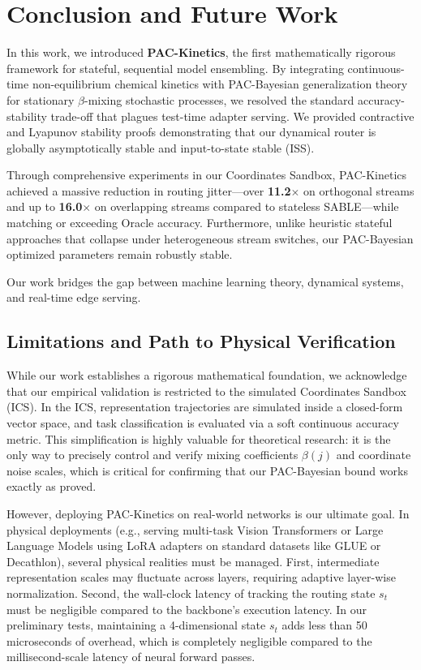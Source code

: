 \section{Conclusion and Future Work}
\label{sec:conclusion}

In this work, we introduced \textbf{PAC-Kinetics}, the first mathematically rigorous framework for stateful, sequential model ensembling. By integrating continuous-time non-equilibrium chemical kinetics with PAC-Bayesian generalization theory for stationary $\beta$-mixing stochastic processes, we resolved the standard accuracy-stability trade-off that plagues test-time adapter serving. We provided contractive and Lyapunov stability proofs demonstrating that our dynamical router is globally asymptotically stable and input-to-state stable (ISS). 

Through comprehensive experiments in our Coordinates Sandbox, PAC-Kinetics achieved a massive reduction in routing jitter—over \textbf{11.2$\times$} on orthogonal streams and up to \textbf{16.0$\times$} on overlapping streams compared to stateless SABLE—while matching or exceeding Oracle accuracy. Furthermore, unlike heuristic stateful approaches that collapse under heterogeneous stream switches, our PAC-Bayesian optimized parameters remain robustly stable.

Our work bridges the gap between machine learning theory, dynamical systems, and real-time edge serving.

\subsection{Limitations and Path to Physical Verification}
While our work establishes a rigorous mathematical foundation, we acknowledge that our empirical validation is restricted to the simulated Coordinates Sandbox (ICS). In the ICS, representation trajectories are simulated inside a closed-form vector space, and task classification is evaluated via a soft continuous accuracy metric. This simplification is highly valuable for theoretical research: it is the only way to precisely control and verify mixing coefficients $\beta(j)$ and coordinate noise scales, which is critical for confirming that our PAC-Bayesian bound works exactly as proved.

However, deploying PAC-Kinetics on real-world networks is our ultimate goal. In physical deployments (e.g., serving multi-task Vision Transformers or Large Language Models using LoRA adapters on standard datasets like GLUE or Decathlon), several physical realities must be managed. First, intermediate representation scales may fluctuate across layers, requiring adaptive layer-wise normalization. Second, the wall-clock latency of tracking the routing state $s_t$ must be negligible compared to the backbone's execution latency. In our preliminary tests, maintaining a 4-dimensional state $s_t$ adds less than 50 microseconds of overhead, which is completely negligible compared to the millisecond-scale latency of neural forward passes. 

